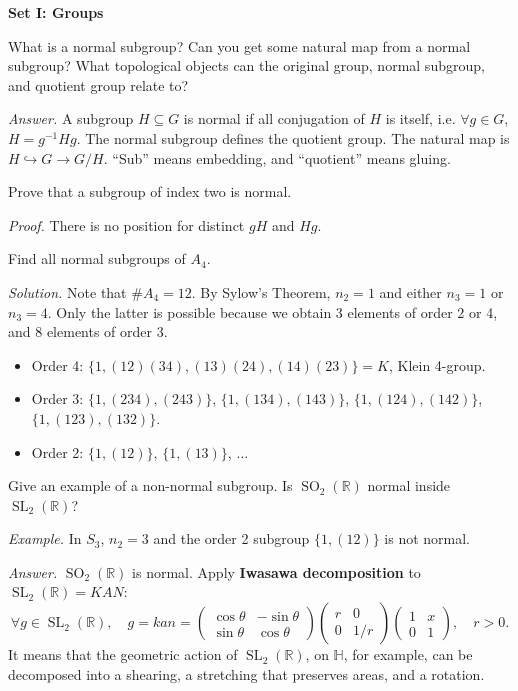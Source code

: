 \documentclass{mathproblems}
\newcommand\R{\mathbb{R}}
\begin{document}
\centerline {\textbf{Set I: Groups}}

\begin{questions}
\miquestion
{\color{blue} What is a normal subgroup? Can you get some natural map from a normal subgroup? What topological objects can the original group, normal subgroup, and quotient group relate to?}

\textit{Answer.} A subgroup $H\subseteq G$ is normal if all conjugation of $H$ is itself, i.e. $\forall g\in G$, $H=g^{-1}Hg$. The normal subgroup defines the quotient group. The natural map is $H\hookrightarrow G \rightarrow G/H$. ``Sub'' means embedding, and ``quotient'' means gluing.


\miquestion
{\color{blue} Prove that a subgroup of index two is normal.}

\textit{Proof.} There is no position for distinct $gH$ and $Hg$.


\miquestion
{\color{blue} Find all normal subgroups of $A_4$.}

\textit{Solution.} Note that $\#A_4=12$. By Sylow's Theorem, $n_2=1$ and either $n_3=1$ or $n_3=4$. Only the latter is possible because we obtain 3 elements of order 2 or 4, and 8 elements of order 3.
\begin{itemize}
    \item Order 4: $\{1,(12)(34),(13)(24),(14)(23)\}=K$, Klein 4-group.
    \item Order 3: $\{1,(234),(243)\}$, $\{1,(134),(143)\}$, $\{1,(124),(142)\}$, $\{1,(123),(132)\}$.
    \item Order 2: $\{1,(12)\}$, $\{1,(13)\}$, $\ldots$
\end{itemize}


\miquestion
{\color{blue} Give an example of a non-normal subgroup. Is $\operatorname{SO}_2(\R)$ normal inside $\operatorname{SL}_2(\R)$?}

\textit{Example.}
In $S_3$, $n_2=3$ and the order 2 subgroup $\{1,(12)\}$ is not normal.

\textit{Answer.} 
$\operatorname{SO}_2(\R)$ is normal. Apply {\color{violet}\textbf{Iwasawa decomposition}} to $\operatorname{SL}_2(\R)=KAN$:
$$
\forall g\in \operatorname{SL}_2(\R),\quad g=kan=\begin{pmatrix}\cos \theta & -\sin \theta \\ \sin \theta & \cos \theta
\end{pmatrix} \begin{pmatrix}r & 0\\ 0 & 1/r\end{pmatrix} \begin{pmatrix}1 & x\\ 0 & 1\end{pmatrix},\quad r>0.
$$
It means that the geometric action of $\operatorname{SL}_2(\R)$, on $\mathbb{H}$, for example, can be decomposed into a shearing, a stretching that preserves areas, and a rotation.


\end{questions}
\end{document}
